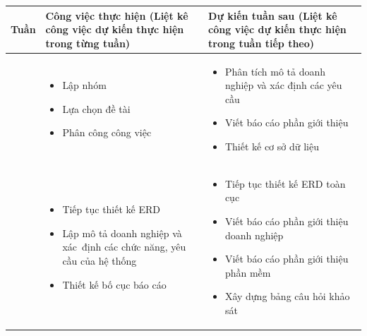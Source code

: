 \documentclass[a4paper,12pt]{report}
\begin{document}
\begin{center}
    \begin{longtable}{|>{\centering\arraybackslash}c|
        >{\centering\arraybackslash}p{7cm}|
        >{\centering\arraybackslash}p{7cm}|}
        \hline
        \textbf{Tuần}                                         &
        \textbf{Công việc thực hiện} \newline
        (Liệt kê công việc dự kiến thực hiện trong từng tuần) &
        \textbf{Dự kiến tuần sau} \newline
        (Liệt kê công việc dự kiến thực hiện trong tuần tiếp theo) \\
        \hline
        1                                                     &
        \begin{itemize}
            \item Lập nhóm
            \item Lựa chọn đề tài
            \item Phân công công việc
        \end{itemize}
                                                              &
        \begin{itemize}
            \item Phân tích mô tả doanh nghiệp và xác định các yêu cầu
            \item Viết báo cáo phần giới thiệu
            \item Thiết kế cơ sở dữ liệu
        \end{itemize}  \\
        \hline
        2                                                     &
        \begin{itemize}
            \item Tiếp tục thiết kế ERD
            \item Lập mô tả doanh nghiệp và xác~định các chức năng, yêu cầu của hệ thống
            \item Thiết kế bố cục báo cáo
        \end{itemize}
                                                              &
        \begin{itemize}
            \item Tiếp tục thiết kế ERD toàn cục
            \item Viết báo cáo phần giới thiệu doanh nghiệp
            \item Viết báo cáo phần giới thiệu phần mềm
            \item Xây dựng bảng câu hỏi khảo sát
        \end{itemize}             \\

\end{longtable}
\end{center}
\end{document}
